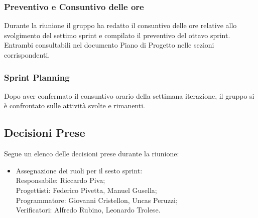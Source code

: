 \documentclass[10pt]{article}
\begin{document}
\subsubsection{Preventivo e Consuntivo delle ore}
Durante la riunione il gruppo ha redatto il consuntivo delle ore relative allo svolgimento del settimo sprint e compilato il preventivo del ottavo sprint. Entrambi consultabili nel documento Piano di Progetto nelle sezioni corrispondenti.\\

\subsubsection{Sprint Planning}
Dopo aver confermato il consuntivo orario della settimana iterazione, il gruppo si è confrontato sulle attività svolte e rimanenti.


\subsection{Decisioni Prese}
Segue un elenco delle decisioni prese durante la riunione:
\begin{itemize}
    \item   Assegnazione dei ruoli per il sesto sprint:\\
            Responsabile: Riccardo Piva;\\
            Progettisti: Federico Pivetta, Manuel Gusella;\\
            Programmatore: Giovanni Cristellon, Uncas Peruzzi;\\
            Verificatori: Alfredo Rubino, Leonardo Trolese.
\end{itemize}
\end{document}
